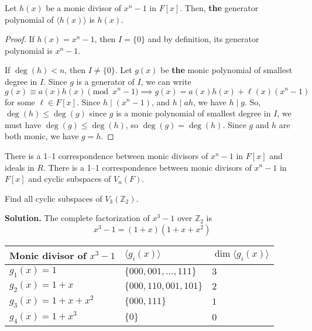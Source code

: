 \begin{Theorem}{}{}
    Let $ h(x) $ be a monic divisor of $ x^n-1 $ in $ F[x] $.
    Then, \textbf{the} generator polynomial of $ \langle h(x)\rangle $
    is $ h(x) $.
\end{Theorem}

\begin{proof}
    If $ h(x)=x^n-1 $, then $ I=\{0\} $ and by definition, its
    generator polynomial is $ x^n-1 $.

    If $ \deg(h)<n $, then $ I\neq \{0\} $. Let $ g(x) $
    be \textbf{the} monic polynomial of smallest degree in $ I $.
    Since $ g $ is a generator of $ I $, we can write
    \[ g(x)\equiv a(x)h(x)\pmod{x^n-1}\implies g(x)=a(x)h(x)+\ell(x)(x^n-1) \]
    for some $ \ell\in F[x] $. Since $ h\mid (x^n-1) $, and $ h\mid ah $,
    we have $ h\mid g $. So, $ \deg(h)\leqslant \deg(g) $ since
    $ g $ is a monic polynomial of smallest degree in $ I $,
    we must have $ \deg(g)\leqslant \deg(h) $, so $ \deg(g)=\deg(h) $.
    Since $ g $ and $ h $ are both monic, we have
    $ g=h $.
\end{proof}

\begin{Corollary}{}{}
    There is a 1--1 correspondence between monic
    divisors of $ x^n-1 $ in $ F[x] $ and ideals in $ R $.
    There is a 1--1 correspondence between monic
    divisors of $ x^n-1 $ in $ F[x] $ and cyclic
    subspaces of $ V_n(F) $.
\end{Corollary}

\begin{Example}{}{}
    Find all cyclic subspaces of $ V_3(\mathbb{Z}_2) $.

    \textbf{Solution.} The complete factorization
    of $ x^3-1 $ over $ \mathbb{Z}_2 $ is
    \[ x^3-1=(1+x)(1+x+x^2) \]

    \begin{table}[H]
        \centering
        \begin{tabularx}{0.8\linewidth}{@{}YYY@{}}
            Monic divisor of $ x^3-1 $ & $ \langle g_i(x) \rangle $  & $ \dim \langle g_i(x) \rangle $ \\
            \midrule
            \midrule
            $ g_1(x)=1 $               & $ \{000,001,\ldots ,111\} $ & $ 3 $                           \\
            \midrule
            $ g_2(x)=1+x $             & $ \{000,110,001,101\} $     & $ 2 $                           \\
            \midrule
            $ g_3(x)=1+x+x^2 $         & $ \{000,111\} $             & $ 1 $                           \\
            \midrule
            $ g_4(x)=1+x^3 $           & $ \{0\} $                   & $ 0 $                           \\
        \end{tabularx}
    \end{table}
\end{Example}
